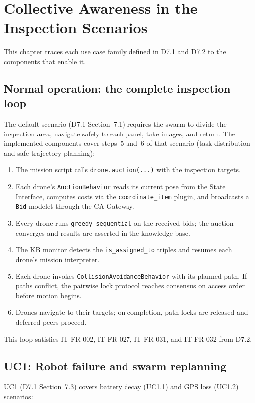 \documentclass[deliverable]{csreport}
\renewcommand{\code}[1]{\texttt{\textcolor{CSMaroon}{#1}}}%
\begin{document}
\chapter{Collective Awareness in the Inspection Scenarios}
\label{ch:scenarios}

This chapter traces each use case family defined in D7.1 and D7.2 to the components that enable it.

\section{Normal operation: the complete inspection loop}

The default scenario (D7.1 Section~7.1) requires the swarm to divide the inspection area, navigate safely to each panel, take images, and return. The implemented components cover steps~5 and~6 of that scenario (task distribution and safe trajectory planning):

\begin{enumerate}
  \item The mission script calls \code{drone.auction(...)} with the inspection targets.
  \item Each drone's \code{AuctionBehavior} reads its current pose from the State Interface, computes costs via the \code{coordinate\_item} plugin, and broadcasts a \code{Bid} modelet through the CA Gateway.
  \item Every drone runs \code{greedy\_sequential} on the received bids; the auction converges and results are asserted in the knowledge base.
  \item The KB monitor detects the \code{is\_assigned\_to} triples and resumes each drone's mission interpreter.
  \item Each drone invokes \code{CollisionAvoidanceBehavior} with its planned path. If paths conflict, the pairwise lock protocol reaches consensus on access order before motion begins.
  \item Drones navigate to their targets; on completion, path locks are released and deferred peers proceed.
\end{enumerate}

This loop satisfies IT-FR-002, IT-FR-027, IT-FR-031, and IT-FR-032 from D7.2.

\section{UC1: Robot failure and swarm replanning}

UC1 (D7.1 Section~7.3) covers battery decay (UC1.1) and GPS loss (UC1.2) scenarios:
\end{document}
